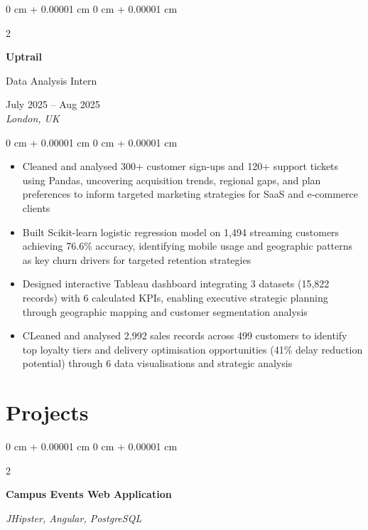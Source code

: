 \documentclass[10pt, a4paper]{article}
\newenvironment{highlights}{
    \begin{itemize}[
        topsep=0.10 cm,
        parsep=0.10 cm,
        partopsep=0pt,
        itemsep=0pt,
        leftmargin=20pt
    ]
}{
    \end{itemize}
} %
\newenvironment{onecolentry}{
    \begin{adjustwidth}{
        0 cm + 0.00001 cm
    }{
        0 cm + 0.00001 cm
    }
}{
    \end{adjustwidth}
} %
\newenvironment{twocolentry}[2][]{
    \onecolentry
    \def\secondColumn{#2}
    \setcolumnwidth{\fill, 4.5 cm}
    \begin{paracol}{2}
}{
    \switchcolumn \raggedleft \secondColumn
    \end{paracol}
    \endonecolentry
} %
\begin{document}
    \vspace{0.15 cm}

    \begin{twocolentry}{
        July 2025 -- Aug 2025 \\
        \textit{London, UK}
    }
        \textbf{Uptrail}
        
        Data Analysis Intern
    \end{twocolentry}

    \vspace{0.10 cm}
    \begin{onecolentry}
        \begin{highlights}
            \item Cleaned and analysed 300+ customer sign-ups and 120+ support tickets using Pandas, uncovering acquisition trends, regional gaps, and plan preferences to inform targeted marketing strategies for SaaS and e-commerce clients
            \item Built Scikit-learn logistic regression model on 1,494 streaming customers achieving 76.6\% accuracy, identifying mobile usage and geographic patterns as key churn drivers for targeted retention strategies
            \item Designed interactive Tableau dashboard integrating 3 datasets (15,822 records) with 6 calculated KPIs, enabling executive strategic planning through geographic mapping and customer segmentation analysis
            \item CLeaned and analysed 2,992 sales records across 499 customers to identify top loyalty tiers and delivery optimisation opportunities (41\% delay reduction potential) through 6 data visualisations and strategic analysis
        \end{highlights}
    \end{onecolentry}

    \vspace{0.15 cm}

    \section{Projects}


    \begin{twocolentry}{
        \textit{JHipster, Angular, PostgreSQL}
    }
        \textbf{Campus Events Web Application}
    \end{twocolentry}
\end{document}
